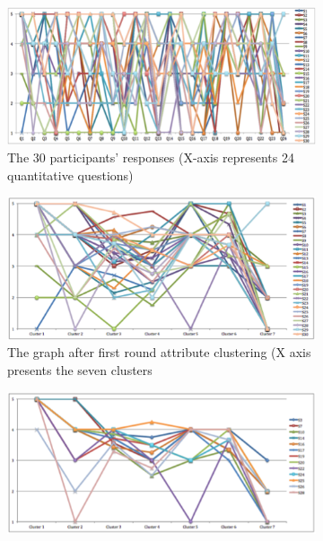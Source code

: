 \begin{figure}[!hbt]\centering
    \begin{subfigure}{0.49\textwidth}
 \includegraphics[width=\textwidth]{persona1a}
 \caption{The 30 participants' responses (X-axis represents 24 quantitative questions)}
    \end{subfigure}\hspace{0.01\textwidth}
    \begin{subfigure}{0.49\textwidth}
\includegraphics[width=\textwidth]{persona1b}
  \caption{The graph after first round attribute clustering (X axis presents the seven clusters}
    \end{subfigure}
    \begin{subfigure}{0.49\textwidth}
        \includegraphics[width=\textwidth]{persona1c}

\end{subfigure}
\end{figure}
